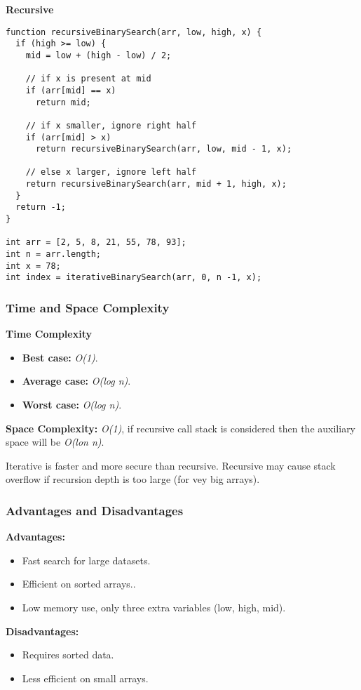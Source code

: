 \textbf{Recursive}

\begin{lstlisting}[style=general]
function recursiveBinarySearch(arr, low, high, x) {
  if (high >= low) {
    mid = low + (high - low) / 2;

    // if x is present at mid
    if (arr[mid] == x)
      return mid;

    // if x smaller, ignore right half
    if (arr[mid] > x)
      return recursiveBinarySearch(arr, low, mid - 1, x);

    // else x larger, ignore left half
    return recursiveBinarySearch(arr, mid + 1, high, x);
  }
  return -1;
}

int arr = [2, 5, 8, 21, 55, 78, 93];
int n = arr.length;
int x = 78;
int index = iterativeBinarySearch(arr, 0, n -1, x);
\end{lstlisting}

\subsubsection*{Time and Space Complexity}

\textbf{Time Complexity}

\begin{itemize}
  \item \textbf{Best case:} \textit{O(1)}.
  \item \textbf{Average case:} \emph{O(log n)}.
  \item \textbf{Worst case:} \textit{O(log n)}.
\end{itemize}

\textbf{Space Complexity:} \textit{O(1)}, if recursive call stack is considered then the auxiliary space will be \textit{O(lon n)}.

Iterative is faster and more secure than recursive. Recursive may cause stack overflow if recursion depth is too large (for vey big arrays).

\subsubsection*{Advantages and Disadvantages}

\textbf{Advantages:}

\begin{itemize}
  \item Fast search for large datasets.
  \item Efficient on sorted arrays..
  \item Low memory use, only three extra variables (low, high, mid).
\end{itemize}

\textbf{Disadvantages:}

\begin{itemize}
  \item Requires sorted data.
  \item Less efficient on small arrays.
\end{itemize}
